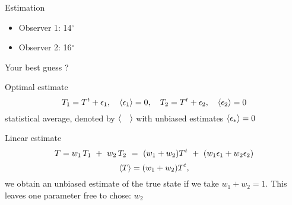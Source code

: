 
\begin{frame}{Estimation}
\begin{itemize}
\item
Observer 1: 14$^\circ$
\item
Observer 2: 16$^\circ$
\end{itemize}

\centerline{Your best guess ?}

\end{frame}


\begin{frame}{Optimal estimate}
\begin{equation}
T_1 = {T}^t+\epsilon_1, \quad \left\langle \epsilon_1 \right\rangle = 0, \quad T_2 = {T}^t+\epsilon_2, \quad \left\langle \epsilon_2 \right\rangle = 0
\end{equation}
statistical average, denoted by $\left\langle \quad \right\rangle$ with unbiased estimates $\left\langle \epsilon_* \right\rangle=0$

Linear estimate
\begin{equation}
{T}=w_1 \, T_1 ~+~ w_2 \, T_2 ~=~ (w_1+w_2) {T}^t ~+~ (w_1 \epsilon_1 + w_2 \epsilon_2)
\end{equation}
\begin{equation}
\left\langle {T} \right\rangle = (w_1+w_2) {T}^t,
\end{equation}
we obtain an unbiased estimate of the true state if we take $w_1+w_2=1$. This leaves one parameter free to chose: $w_2$
\begin{center}
\end{center}
\end{frame}


